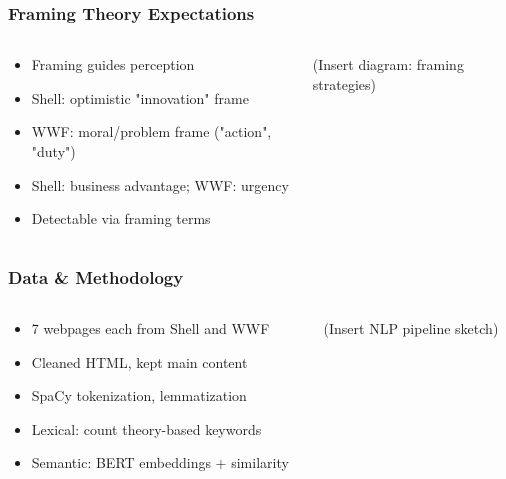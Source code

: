 \documentclass[aspectratio=1610]{beamer}
\begin{document}
\begin{frame}
  \frametitle{Framing Theory Expectations}
  \begin{columns}
    \begin{column}{0.6\textwidth}
      \begin{itemize}
        \item Framing guides perception
        \item Shell: optimistic "innovation" frame
        \item WWF: moral/problem frame ("action", "duty")
        \item Shell: business advantage; WWF: urgency
        \item Detectable via framing terms
      \end{itemize}
    \end{column}
    \begin{column}{0.4\textwidth}
      (Insert diagram: framing strategies)
    \end{column}
  \end{columns}
\end{frame}

\begin{frame}
  \frametitle{Data \& Methodology}
  \begin{columns}
    \begin{column}{0.6\textwidth}
      \begin{itemize}
        \item 7 webpages each from Shell and WWF
        \item Cleaned HTML, kept main content
        \item SpaCy tokenization, lemmatization
        \item Lexical: count theory-based keywords
        \item Semantic: BERT embeddings + similarity
      \end{itemize}
    \end{column}
    \begin{column}{0.4\textwidth}
      (Insert NLP pipeline sketch)
    \end{column}
  \end{columns}
\end{frame}
\end{document}
